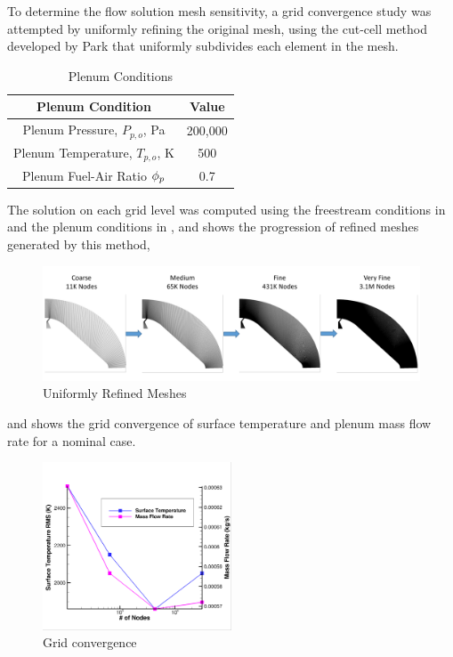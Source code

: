 To determine the flow solution mesh sensitivity, a grid convergence study was
attempted by uniformly refining the original mesh, using the cut-cell method
developed by Park\cite{park2008anisotropic} that uniformly subdivides each
element in the mesh.
\begin{table}[h]
  \centering
  \begin{tabular}{c|c}
    Plenum Condition & Value \\
    \hline
    Plenum Pressure, $P_{p,o}$, Pa   & 200,000 \\
    Plenum Temperature, $T_{p,o}$, K &  500 \\
    Plenum Fuel-Air Ratio $\phi_p$      &  0.7
  \end{tabular}
  \caption{Plenum Conditions}
  \label{tab:plenum-conditions}
\end{table}
The solution on each grid level was computed using the freestream conditions in
 and the plenum conditions in
, and  shows the progression
of refined meshes generated by this method,
\begin{figure}[h]
  \centering
  \includegraphics[width=\textwidth]{figures/mesh-progression.png}
  \caption{Uniformly Refined Meshes}
  \label{fig:mesh-refined}
\end{figure}
and  shows the grid convergence of surface
temperature and plenum mass flow rate for a nominal case.
\begin{figure}[!h]
  \centering
  \includegraphics[width=0.5\textwidth]{figures/t-m-conv.png}
  \caption{Grid convergence }
  \label{fig:grid-convergence}
\end{figure}
